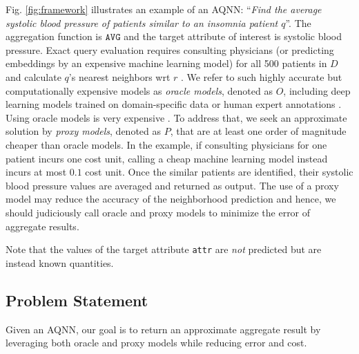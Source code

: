 

Fig. \ref{fig:framework} illustrates an example of an AQNN: ``\textit{Find the average systolic blood pressure of patients similar to an insomnia patient \(q\)}''. The aggregation function is \(\mathtt{AVG}\) and the target attribute of interest is systolic blood pressure. Exact query evaluation requires consulting physicians (or predicting embeddings by an expensive machine learning model) for all 500 patients in \(D\) and calculate \(q\)'s nearest neighbors wrt \(r\) \cite{DBLP:journals/isci/RodriguesGSBA21}. We refer to such highly accurate but computationally expensive models as \textit{oracle models}, denoted as \(O\), including deep learning models trained on domain-specific data or human expert annotations \cite{DBLP:conf/sigmod/LuCKC18}. Using oracle models is very expensive \cite{sze2017efficient, DujianPQA, DBLP:journals/pvldb/KangGBHZ20}. To address that, we seek an approximate solution by \textit{proxy models}, denoted as \(P\), that are at least one order of magnitude cheaper than oracle models. In the example, if consulting physicians for one patient incurs one cost unit, calling a cheap machine learning model instead incurs at most \(0.1\) cost unit. Once the similar patients are identified, their systolic blood pressure values are averaged and returned as  output. The use of a proxy model may reduce the accuracy of the neighborhood prediction and hence, we should judiciously call oracle and proxy models to minimize the error of aggregate results.

Note that the values of the target attribute \texttt{attr} are \textit{not} predicted but are instead known quantities.

\subsection{Problem Statement}
Given an AQNN, our goal is to return an approximate aggregate result by leveraging both oracle and proxy models while reducing error and cost.

